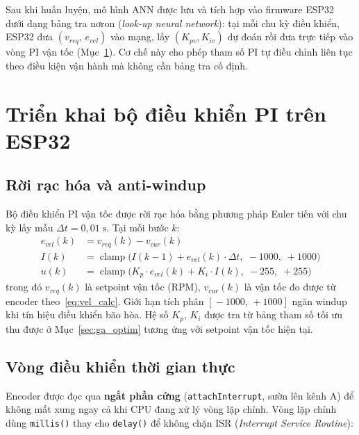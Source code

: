 Sau khi huấn luyện, mô hình ANN được lưu và tích hợp vào firmware
ESP32 dưới dạng bảng tra nơron (\textit{look-up neural network}):
tại mỗi chu kỳ điều khiển, ESP32 đưa $(v_{req},\, e_{vel})$ vào mạng,
lấy $(K_{pv}, K_{iv})$ dự đoán rồi đưa trực tiếp vào vòng PI vận tốc
(Mục~\ref{sec:esp32_deploy}). Cơ chế này cho phép tham số PI tự điều
chỉnh liên tục theo điều kiện vận hành mà không cần bảng tra cố định.


\section{Triển khai bộ điều khiển PI trên ESP32}
\label{sec:esp32_deploy}

\subsection{Rời rạc hóa và anti-windup}

Bộ điều khiển PI vận tốc được rời rạc hóa bằng phương pháp Euler tiến
với chu kỳ lấy mẫu $\Delta t = 0{,}01\;\text{s}$. Tại mỗi bước $k$:
\begin{align}
    e_{vel}(k) &= v_{req}(k) - v_{cur}(k)
    \label{eq:esp32_err} \\
    I(k) &= \operatorname{clamp}\!\bigl(
             I(k{-}1) + e_{vel}(k)\cdot\Delta t,\;
             -1000,\; +1000\bigr)
    \label{eq:esp32_int} \\
    u(k) &= \operatorname{clamp}\!\bigl(
             K_p\cdot e_{vel}(k) + K_i\cdot I(k),\;
             -255,\; +255\bigr)
    \label{eq:esp32_u}
\end{align}
trong đó $v_{req}(k)$ là setpoint vận tốc (RPM), $v_{cur}(k)$ là vận tốc
đo được từ encoder theo~\eqref{eq:vel_calc}. Giới hạn tích phân
$[\!-1000,\,+1000\!]$ ngăn windup khi tín hiệu điều khiển bão hòa.
Hệ số $K_p,\,K_i$ được tra từ bảng tham số tối ưu thu được ở
Mục~\ref{sec:ga_optim} tương ứng với setpoint vận tốc hiện tại.

\subsection{Vòng điều khiển thời gian thực}

Encoder được đọc qua \textbf{ngắt phần cứng} (\texttt{attachInterrupt},
sườn lên kênh A) để không mất xung ngay cả khi CPU đang xử lý vòng lặp
chính. Vòng lặp chính dùng \texttt{millis()} thay cho \texttt{delay()}
để không chặn ISR (\textit{Interrupt Service Routine}):


